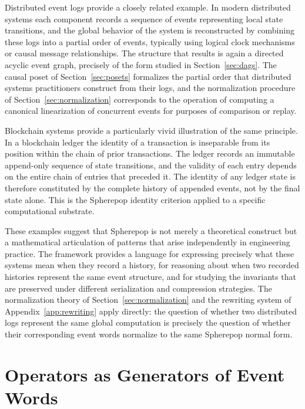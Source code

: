 \documentclass[12pt]{article}
\theoremstyle{plain}
\theoremstyle{definition}
\theoremstyle{remark}
\begin{document}
Distributed event logs provide a closely related example.  In modern
distributed systems each component records a sequence of events representing
local state transitions, and the global behavior of the system is reconstructed
by combining these logs into a partial order of events, typically using logical
clock mechanisms or causal message relationships.  The structure that results
is again a directed acyclic event graph, precisely of the form studied in
Section~\ref{sec:dags}.  The causal poset of Section~\ref{sec:posets} formalizes
the partial order that distributed systems practitioners construct from their
logs, and the normalization procedure of Section~\ref{sec:normalization}
corresponds to the operation of computing a canonical linearization of
concurrent events for purposes of comparison or replay.

Blockchain systems provide a particularly vivid illustration of the same
principle.  In a blockchain ledger the identity of a transaction is
inseparable from its position within the chain of prior transactions.  The
ledger records an immutable append-only sequence of state transitions, and
the validity of each entry depends on the entire chain of entries that
preceded it.  The identity of any ledger state is therefore constituted by
the complete history of appended events, not by the final state alone.  This
is the Spherepop identity criterion applied to a specific computational
substrate.

These examples suggest that Spherepop is not merely a theoretical construct
but a mathematical articulation of patterns that arise independently in
engineering practice.  The framework provides a language for expressing
precisely what these systems mean when they record a history, for reasoning
about when two recorded histories represent the same event structure, and for
studying the invariants that are preserved under different serialization and
compression strategies.  The normalization theory of Section~\ref{sec:normalization}
and the rewriting system of Appendix~\ref{app:rewriting} apply directly: the
question of whether two distributed logs represent the same global computation
is precisely the question of whether their corresponding event words normalize
to the same Spherepop normal form.






\section{Operators as Generators of Event Words}
\label{sec:opvocab}
\end{document}
